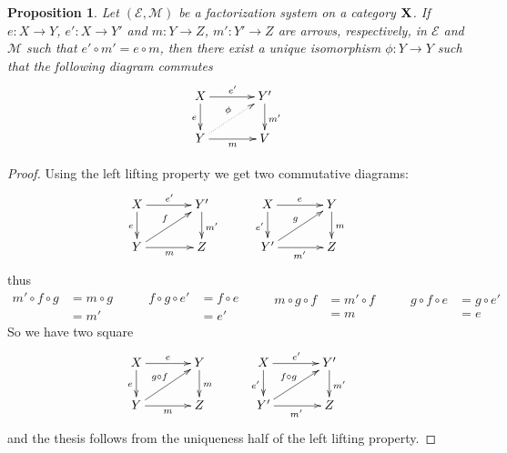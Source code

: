 \documentclass[a4paper]{article}
\def\X{\textbf {\textup{X}}}
\newtheorem{proposition}[theorem]{Proposition}
\theoremstyle{definition}
\begin{document}
\begin{proposition}\label{prop:iso}
	Let $(\mathcal{E}, \mathcal{M})$ be a factorization system on a category $\X$. If $e\colon X\to Y$, $e'\colon X\to Y'$ and $m\colon Y\to Z$, $m'\colon Y'\to Z $ are arrows, respectively, in $\mathcal{E}$ and $\mathcal{M}$ such that
	$e'\circ m'=e\circ m$,  then  there exist a unique isomorphism $\phi\colon Y \rightarrow Y$ such that the following diagram commutes
	\[\xymatrix@C=35pt@R=20pt{X \ar[r]^{e'} \ar[d]_{e}& Y' \ar[d]^{m'}\\ Y \ar[r]_{m} \ar@{.>}[ur]^{\phi}& V}\]
\end{proposition}
\begin{proof}Using the left lifting property we get two commutative diagrams:
	\[\xymatrix@C=35pt@R=20pt{
		X\ar[r]^{e'}  \ar[d]_{e}& Y'  \ar[d]^{m'} &  X 	\ar[d]_{e'} \ar[r]^{e} &Y \ar[d]^{m}\\
		Y \ar[r]_{m} \ar[ur]^{f} & Z & Y'  \ar[r]_{m'}\ar[ur]^{g} & Z
	}\]
	thus
	\[	\begin{split}
		m'\circ f \circ g &= m\circ g \\&= m'
	\end{split} \qquad 
	\begin{split}
		f \circ g \circ e' &= f\circ e \\&= e'
	\end{split}\qquad 
	\begin{split}
		m\circ g \circ f &= m'\circ f \\&= m
	\end{split} \qquad 
	\begin{split}
		g \circ f \circ e &= g\circ e' \\&= e
	\end{split}
	\]
	So we have two square
	\[\xymatrix@C=35pt@R=20pt{
		X\ar[r]^{e}  \ar[d]_{e}& Y  \ar[d]^{m} &  X 	\ar[d]_{e'} \ar[r]^{e'} &Y '\ar[d]^{m'}\\
		Y \ar[r]_{m} \ar[ur]^{g\circ f} & Z & Y'  \ar[r]_{m'}\ar[ur]^{f\circ g} & Z
	}\]		
	and the thesis follows from the uniqueness half of the left lifting property.
\end{proof}
\end{document}
